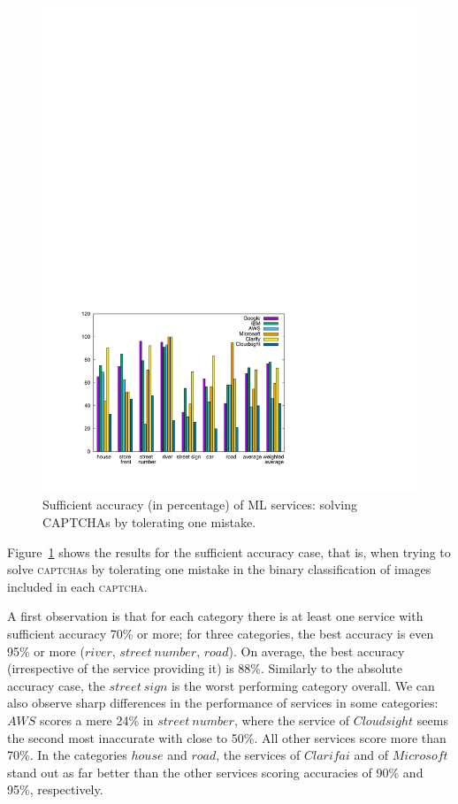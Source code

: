 \documentclass[sigconf,review,anonymous]{acmart}
\newcommand{\captcha}{\textsc{captcha}\xspace}
\newcommand{\captchas}{\textsc{captcha}s\xspace}
\begin{document}
\begin{figure}[t]
\centering
\includegraphics[width=\columnwidth]{images/broken-1.pdf}
\caption{Sufficient accuracy (in percentage) of ML services: solving CAPTCHAs by tolerating one mistake.}
\label{res-broken-captchas}
\end{figure}

Figure~\ref{res-broken-captchas} shows the results for the sufficient accuracy case, that is, when trying to solve \captchas by tolerating one mistake in the binary classification of images included in each \captcha. 

A first observation is that for each category there is at least one service with sufficient accuracy 70\% or more; for three categories, the best accuracy is even 95\% or more ($river$, $street~number$, $road$).
On average, the best accuracy (irrespective of the service providing it) is 88\%.
Similarly to the absolute accuracy case, the $street~sign$ is the worst performing category overall. We can also observe sharp differences in the performance of services in some categories: $AWS$ scores a mere 24\% in $street~number$, where the service of $Cloudsight$ seems the second most inaccurate with close to 50\%. All other services score more than 70\%.
In the categories $house$ and $road$, the services of $Clarifai$ and of $Microsoft$ stand out as far better than the other services scoring accuracies of 90\% and 95\%, respectively.
\end{document}
